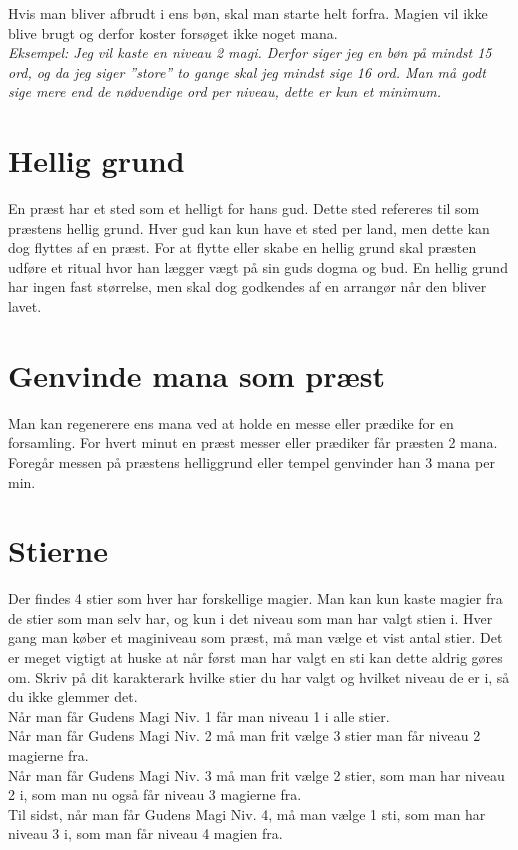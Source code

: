 Hvis man bliver afbrudt i ens bøn, skal man starte helt forfra. Magien vil ikke blive brugt og derfor koster forsøget ikke noget mana.\\
\textit{Eksempel: Jeg vil kaste en niveau 2 magi. Derfor siger jeg en bøn på mindst 15 ord, og da jeg siger ”store” to gange skal jeg mindst sige 16 ord. Man må godt sige mere end de nødvendige ord per niveau, dette er kun et minimum.}

\section{Hellig grund}
En præst har et sted som et helligt for hans gud. Dette sted refereres til som præstens hellig grund. Hver gud kan kun have et sted per land, men dette kan dog flyttes af en præst. For at flytte eller skabe en hellig grund skal præsten udføre et ritual hvor han lægger vægt på sin guds dogma og bud. En hellig grund har ingen fast størrelse, men skal dog godkendes af en arrangør når den bliver lavet.

\section{Genvinde mana som præst}
Man kan regenerere ens mana ved at holde en messe eller prædike for en forsamling. For hvert minut en præst messer eller prædiker får præsten 2 mana. Foregår messen på præstens helliggrund eller tempel genvinder han 3 mana per min.

\section{Stierne}
Der findes 4 stier som hver har forskellige magier. Man kan kun kaste magier fra de stier som man selv har, og kun i det niveau som man har valgt stien i. Hver gang man køber et maginiveau som præst, må man vælge et vist antal stier. Det er meget vigtigt at huske at når først man har valgt en sti kan dette aldrig gøres om. Skriv på dit karakterark hvilke stier du har valgt og hvilket niveau de er i, så du ikke glemmer det.\\
Når man får Gudens Magi Niv. 1 får man niveau 1 i alle stier. \\
Når man får Gudens Magi Niv. 2 må man frit vælge 3 stier man får niveau 2 magierne fra.\\ 
Når man får Gudens Magi Niv. 3 må man frit vælge 2 stier, som man har niveau 2 i, som man nu også får niveau 3 magierne fra.\\ 
Til sidst, når man får Gudens Magi Niv. 4, må man vælge 1 sti, som man har niveau 3 i, som man får niveau 4 magien fra.








